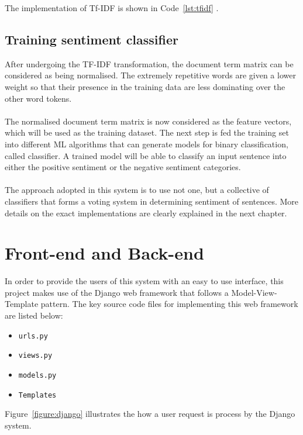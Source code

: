 \documentclass[a4paper]{report}
\newcommand{\code}[1]{\texttt{#1}}
\begin{document}
\noindent
The implementation of Tf-IDF is shown in Code~\ref{lst:tfidf} .  

\subsection{Training sentiment classifier}
After undergoing the TF-IDF transformation, the document term matrix can be considered as being normalised. The extremely repetitive words are given a lower weight so that their presence in the training data are less dominating over the other word tokens.
\\\\
The normalised document term matrix is now considered as the feature vectors, which will be used as the training dataset. The next step is fed the training set into different ML algorithms that can generate models for binary classification, called classifier. A trained model will be able to classify an input sentence into either the positive sentiment or the negative sentiment categories.
\\\\
The approach adopted in this system is to use not one, but a collective of classifiers that forms a voting system in determining sentiment of sentences. More details on the exact implementations are clearly explained in the next chapter.

\section{Front-end and Back-end}
In order to provide the users of this system with an easy to use interface, this project makes use of the Django web framework that follows a Model-View-Template pattern. The key source code files for implementing this web framework are listed below:

\begin{itemize}
	\item \code{urls.py}
	\item \code{views.py}
	\item \code{models.py}
	\item \code{Templates}
\end{itemize}

\noindent
Figure~\ref{figure:django} illustrates the how a user request is process by the Django system.
\end{document}
